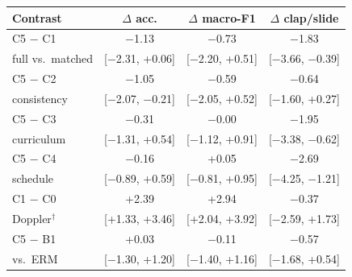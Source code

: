 \begin{tabular}{@{}lccc@{}}
\toprule
Contrast & $\Delta$ acc. & $\Delta$ macro-F1 & $\Delta$ clap/slide \\
\midrule
C5 $-$ C1 & $-$1.13 & $-$0.73 & $-$1.83 \\
\quad full vs.\ matched & \scriptsize [$-$2.31, +0.06] & \scriptsize [$-$2.20, +0.51] & \scriptsize [$-$3.66, $-$0.39] \\
\addlinespace[2pt]
C5 $-$ C2 & $-$1.05 & $-$0.59 & $-$0.64 \\
\quad consistency & \scriptsize [$-$2.07, $-$0.21] & \scriptsize [$-$2.05, +0.52] & \scriptsize [$-$1.60, +0.27] \\
\addlinespace[2pt]
C5 $-$ C3 & $-$0.31 & $-$0.00 & $-$1.95 \\
\quad curriculum & \scriptsize [$-$1.31, +0.54] & \scriptsize [$-$1.12, +0.91] & \scriptsize [$-$3.38, $-$0.62] \\
\addlinespace[2pt]
C5 $-$ C4 & $-$0.16 & +0.05 & $-$2.69 \\
\quad schedule & \scriptsize [$-$0.89, +0.59] & \scriptsize [$-$0.81, +0.95] & \scriptsize [$-$4.25, $-$1.21] \\
\addlinespace[2pt]
C1 $-$ C0 & +2.39 & +2.94 & $-$0.37 \\
\quad Doppler$^{\dagger}$ & \scriptsize [+1.33, +3.46] & \scriptsize [+2.04, +3.92] & \scriptsize [$-$2.59, +1.73] \\
\addlinespace[2pt]
C5 $-$ B1 & +0.03 & $-$0.11 & $-$0.57 \\
\quad vs.\ ERM & \scriptsize [$-$1.30, +1.20] & \scriptsize [$-$1.40, +1.16] & \scriptsize [$-$1.68, +0.54] \\
\bottomrule
\end{tabular}
